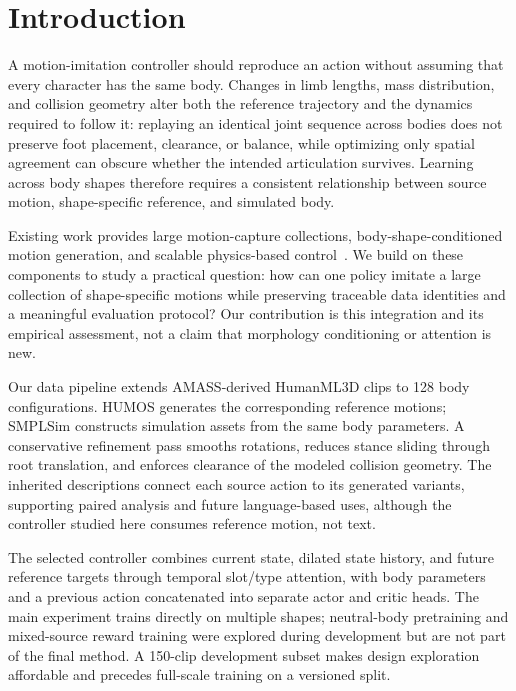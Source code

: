 \section{Introduction}\label{sec:introduction}

A motion-imitation controller should reproduce an action without assuming
that every character has the same body. Changes in limb lengths, mass
distribution, and collision geometry alter both the reference trajectory and
the dynamics required to follow it: replaying an identical joint sequence
across bodies does not preserve foot placement, clearance, or balance, while
optimizing only spatial agreement can obscure whether the intended
articulation survives. Learning across body shapes therefore requires a
consistent relationship between source motion, shape-specific reference, and
simulated body.

Existing work provides large motion-capture collections, body-shape-conditioned
motion generation, and scalable physics-based control~\cite{amass,humanml3d,humos,deepmimic,phc,protomotions}.
We build on these components to study a practical question: how can one
policy imitate a large collection of shape-specific motions while preserving
traceable data identities and a meaningful evaluation protocol? Our
contribution is this integration and its empirical assessment, not a claim
that morphology conditioning or attention is new.

Our data pipeline extends AMASS-derived HumanML3D clips to 128 body
configurations. HUMOS generates the corresponding reference motions; SMPLSim
constructs simulation assets from the same body parameters. A conservative
refinement pass smooths rotations, reduces stance sliding through root
translation, and enforces clearance of the modeled collision geometry. The
inherited descriptions connect each source action to its generated variants,
supporting paired analysis and future language-based uses, although the
controller studied here consumes reference motion, not text.

The selected controller combines current state, dilated state history, and
future reference targets through temporal slot/type attention, with body
parameters and a previous action concatenated into separate actor and critic
heads. The main experiment trains directly on multiple shapes; neutral-body
pretraining and mixed-source reward training were explored during
development but are not part of the final method. A 150-clip development
subset makes design exploration affordable and precedes full-scale training
on a versioned split.

